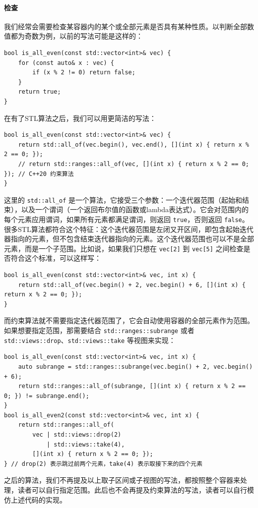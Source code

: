 \paragraph{检查} 我们经常会需要检查某容器内的某个或全部元素是否具有某种性质。以判断全部数值都为奇数为例，以前的写法可能是这样的：
\begin{verbatim}
bool is_all_even(const std::vector<int>& vec) {
    for (const auto& x : vec) {
        if (x % 2 != 0) return false;
    }
    return true;
}
\end{verbatim}
在有了STL算法之后，我们可以用更简洁的写法：
\begin{verbatim}
bool is_all_even(const std::vector<int>& vec) {
    return std::all_of(vec.begin(), vec.end(), [](int x) { return x % 2 == 0; });
    // return std::ranges::all_of(vec, [](int x) { return x % 2 == 0; }); // C++20 约束算法
}
\end{verbatim}
这里的 \verb|std::all_of| 是一个算法，它接受三个参数：一个迭代器范围（起始和结束），以及一个谓词（一个返回布尔值的函数或lambda表达式）。它会对范围内的每个元素应用谓词，如果所有元素都满足谓词，则返回 \verb|true|，否则返回 \verb|false|。很多STL算法都符合这个特征：这个迭代器范围是左闭又开区间，即包含起始迭代器指向的元素，但不包含结束迭代器指向的元素。这个迭代器范围也可以不是全部元素，而是一个子范围。比如说，如果我们只想在 \verb|vec[2]| 到 \verb|vec[5]| 之间检查是否符合这个标准，可以这样写：
\begin{verbatim}
bool is_all_even(const std::vector<int>& vec, int x) {
    return std::all_of(vec.begin() + 2, vec.begin() + 6, [](int x) { return x % 2 == 0; });
}
\end{verbatim}

而约束算法就不需要指定迭代器范围了，它会自动使用容器的全部元素作为范围。如果想要指定范围，那需要结合 \verb|std::ranges::subrange| 或者 \verb|std::views::drop|、\verb|std::views::take| 等视图来实现：
\begin{verbatim}
bool is_all_even(const std::vector<int>& vec, int x) {
    auto subrange = std::ranges::subrange(vec.begin() + 2, vec.begin() + 6);
    return std::ranges::all_of(subrange, [](int x) { return x % 2 == 0; }) != subrange.end();
}
bool is_all_even2(const std::vector<int>& vec, int x) {
    return std::ranges::all_of(
        vec | std::views::drop(2) 
            | std::views::take(4), 
        [](int x) { return x % 2 == 0; });
} // drop(2) 表示跳过前两个元素，take(4) 表示取接下来的四个元素
\end{verbatim}

之后的算法，我们不再提及以上取子区间或子视图的写法，都按照整个容器来处理，读者可以自行指定范围。此后也不会再提及约束算法的写法，读者可以自行模仿上述代码的实现。


